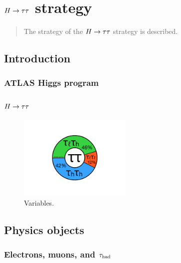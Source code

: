 \chapter[$\Htautau$ strategy][$\Htautau$ strategy]{$\Htautau$ strategy}
\label{chap:strategy}

\begin{quote}
  The strategy of the $\Htautau$ strategy is described.
\end{quote}

\section{Introduction}
\label{sec:strategy-introduction}

\subsection{ATLAS Higgs program}
\label{sec:strategy-higgs}

\subsection{$\Htautau$}
\label{sec:strategy-htautau}

\begin{figure}[tp]
  \centering
  \includegraphics[width=0.48\textwidth]{figures/piecharts/tautaudecay}
  \caption{Variables.}
  \label{fig:strategy-decaypie}
\end{figure}

\section{Physics objects}
\label{sec:strategy-objects}

\subsection{Electrons, muons, and $\tau_\text{had}$}
\label{sec:strategy-leptons}

